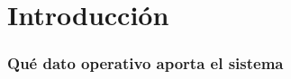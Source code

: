 %
%
%
\section{Introducción}
\label{sec:introduccion}

\subsubsection*{Qué dato operativo aporta el sistema}

